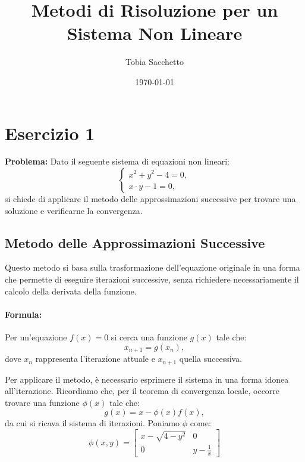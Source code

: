 \documentclass[11pt]{article}
\begin{document}
\title{Metodi di Risoluzione per un Sistema Non Lineare}

\author{Tobia Sacchetto}
\date{\today}
\maketitle

\section*{Esercizio 1}

\textbf{Problema:} Dato il seguente sistema di equazioni non lineari:
\[
\begin{cases}
  x^2 + y^2 - 4 = 0, \\
  x \cdot y - 1 = 0,
\end{cases}
\]
si chiede di applicare il metodo delle approssimazioni successive per trovare una soluzione e verificarne la convergenza.

\subsection*{Metodo delle Approssimazioni Successive}
Questo metodo si basa sulla trasformazione dell'equazione originale in una forma che permette di eseguire iterazioni successive, senza richiedere necessariamente il calcolo della derivata della funzione.

\paragraph{Formula:}  
Per un'equazione \( f(x)=0 \) si cerca una funzione \( g(x) \) tale che:
\[
	x_{n+1}=g(x_n),
\]
dove \( x_n \) rappresenta l'iterazione attuale e \( x_{n+1} \) quella successiva.

Per applicare il metodo, è necessario esprimere il sistema in una forma idonea all'iterazione. Ricordiamo che, per il teorema di convergenza locale, occorre trovare una funzione \( \phi(x) \) tale che:
\[
  g(x) = x - \phi(x) f(x),
\]
da cui si ricava il sistema di iterazioni.
Poniamo $\phi$ come:
\[
\phi(x,y)=\begin{bmatrix}
	x-\sqrt{4-y^2} & 0 \\
	0 & y-\frac{1}{x}
\end{bmatrix}
\]
\end{document}
